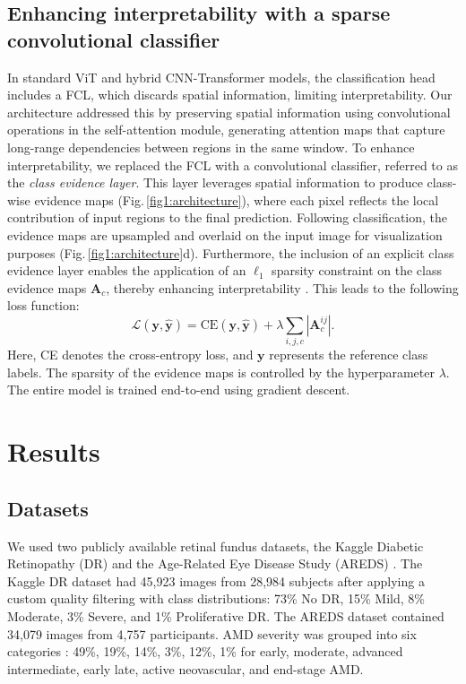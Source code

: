 \documentclass[runningheads]{llncs}
\begin{document}
    \subsection{Enhancing interpretability with a sparse convolutional classifier}
        \label{explainability}
        In standard ViT and hybrid CNN-Transformer models, the classification head includes a FCL, which discards spatial information, limiting interpretability. Our architecture addressed this by preserving spatial information using convolutional operations in the self-attention module, generating attention maps that capture long-range dependencies between regions in the same window.         
        To enhance interpretability, we replaced the FCL with a convolutional classifier, referred to as the \emph{class evidence layer}. This layer leverages spatial information to produce class-wise evidence maps (Fig.\,\ref{fig1:architecture}), where each pixel reflects the local contribution of input regions to the final prediction. Following classification, the evidence maps are upsampled and overlaid on the input image for visualization purposes (Fig.\,\ref{fig1:architecture}d). 
        Furthermore, the inclusion of an explicit class evidence layer enables the application of an $\ell_1$ sparsity constraint on the class evidence maps $\mathbf{A}_c$, thereby enhancing interpretability \cite{donteu2023sparse, djoumessi2025soft}. This leads to the following loss function:  
        \begin{equation}
            \mathcal{L}(\mathbf{y},\mathbf{\hat{y}}) = \mbox{CE}(\mathbf{y}, \mathbf{\hat{y}}) + \lambda \sum_{i,j,c} |\mathbf{A}_c^{ij}| .
            \label{eq:loss}
        \end{equation}
        Here, CE denotes the cross-entropy loss, and $\mathbf{y}$ represents the reference class labels. The sparsity of the evidence maps is controlled by the hyperparameter $\lambda$. The entire model is trained end-to-end using gradient descent. 

\section{Results}
    \subsection{Datasets}
        We used two publicly available retinal fundus datasets, the Kaggle Diabetic Retinopathy (DR) \cite{kaggle_dr_detection} and the Age-Related Eye Disease Study (AREDS) \cite{study1999age}. 
        The Kaggle DR dataset had 45,923 images from 28,984 subjects after applying a custom quality filtering with class distributions: 73\% No DR, 15\% Mild, 8\% Moderate, 3\% Severe, and 1\% Proliferative DR. 
        The AREDS dataset contained 34,079 images from 4,757 participants. AMD severity was grouped into six categories \cite{al2017recent, study1999age}: 49\%, 19\%, 14\%, 3\%, 12\%, 1\% for early, moderate, advanced intermediate, early late, active neovascular, and end-stage AMD. 
\end{document}

